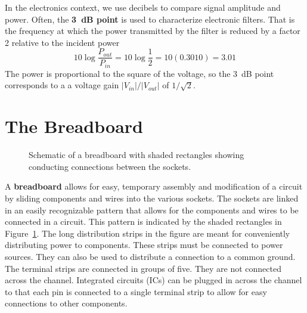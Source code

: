 \documentclass[11pt]{article}
\begin{document}
In the electronics  context, we use decibels to compare signal
amplitude and power. Often, the \textbf{3~dB point} is used to characterize 
electronic filters. That is the frequency at which the power
transmitted by the filter is reduced by a factor 2 relative to the
incident power 
\[
10 \log \frac{P_{out}}{P_{in}} = 10 \log \frac{1}{2} = 10 (0.3010) = 3.01
\]
The power is proportional to the square of the voltage, so the 3~dB
point corresponds to a a voltage gain $|V_{in}|/|V_{out}|$ of
$1/\sqrt{2}$. 

\section{The Breadboard}
\label{sec:breadboard}

\begin{figure}[ht]
  \begin{center}
    \caption{Schematic of a breadboard with shaded rectangles showing
      conducting connections between the sockets.}
    \label{fig:breadboard}
  \end{center}
\end{figure}

A \textbf{breadboard} allows for easy, temporary assembly and
modification of a circuit by sliding components and wires into the
various sockets. The sockets are linked in an easily recognizable
pattern that allows for the components and wires to be connected in a
circuit. This pattern is indicated by the shaded rectangles in
Figure~\ref{fig:breadboard}.  The long distribution strips in the
figure are meant for conveniently distributing power to
components. These strips must be connected to power sources. They can
also be used to distribute a connection to a common ground.  The
terminal strips are connected in groups of five. They are not
connected across the channel. Integrated circuits (ICs) can be plugged
in across the channel to that each pin is connected to a single
terminal strip to allow for easy connections to other components.
\end{document}
